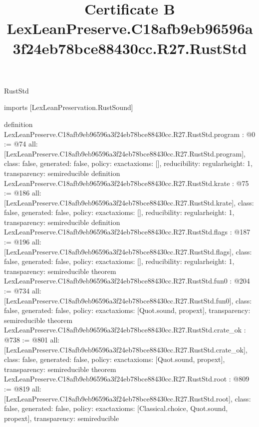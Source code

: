 \begin{lexlean}{RustStd}
\title{Certificate B LexLeanPreserve.C18afb9eb96596a3f24eb78bce88430cc.R27.RustStd}
\begin{coremodule}
imports [LexLeanPreservation.RustSound]

definition LexLeanPreserve.C18afb9eb96596a3f24eb78bce88430cc.R27.RustStd.program : @0 := @74 {
  all: [LexLeanPreserve.C18afb9eb96596a3f24eb78bce88430cc.R27.RustStd.program],
  class: false,
  generated: false,
  policy: exact{axioms: []},
  reducibility: regular{height: 1},
  transparency: semireducible
}
definition LexLeanPreserve.C18afb9eb96596a3f24eb78bce88430cc.R27.RustStd.krate : @75 := @186 {
  all: [LexLeanPreserve.C18afb9eb96596a3f24eb78bce88430cc.R27.RustStd.krate],
  class: false,
  generated: false,
  policy: exact{axioms: []},
  reducibility: regular{height: 1},
  transparency: semireducible
}
definition LexLeanPreserve.C18afb9eb96596a3f24eb78bce88430cc.R27.RustStd.flags : @187 := @196 {
  all: [LexLeanPreserve.C18afb9eb96596a3f24eb78bce88430cc.R27.RustStd.flags],
  class: false,
  generated: false,
  policy: exact{axioms: []},
  reducibility: regular{height: 1},
  transparency: semireducible
}
theorem LexLeanPreserve.C18afb9eb96596a3f24eb78bce88430cc.R27.RustStd.fun0 : @204 := @734 {
  all: [LexLeanPreserve.C18afb9eb96596a3f24eb78bce88430cc.R27.RustStd.fun0],
  class: false,
  generated: false,
  policy: exact{axioms: [Quot.sound, propext]},
  transparency: semireducible
}
theorem LexLeanPreserve.C18afb9eb96596a3f24eb78bce88430cc.R27.RustStd.crate_ok : @738 := @801 {
  all: [LexLeanPreserve.C18afb9eb96596a3f24eb78bce88430cc.R27.RustStd.crate_ok],
  class: false,
  generated: false,
  policy: exact{axioms: [Quot.sound, propext]},
  transparency: semireducible
}
theorem LexLeanPreserve.C18afb9eb96596a3f24eb78bce88430cc.R27.RustStd.root : @809 := @819 {
  all: [LexLeanPreserve.C18afb9eb96596a3f24eb78bce88430cc.R27.RustStd.root],
  class: false,
  generated: false,
  policy: exact{axioms: [Classical.choice, Quot.sound, propext]},
  transparency: semireducible
}


\end{coremodule}
\end{lexlean}
